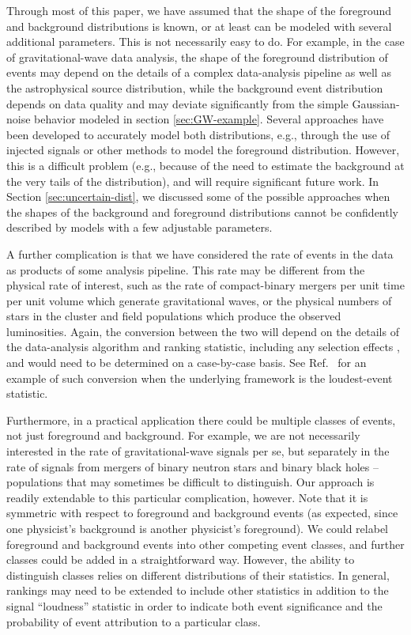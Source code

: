 \documentclass[aps,prd,reprint,nofootinbib]{revtex4-1}
\begin{document}
Through most of this paper, we have assumed that the shape of the
foreground and background distributions is known, or at least can be
modeled with several additional parameters.  This is not necessarily
easy to do.  For example, in the case of gravitational-wave data
analysis, the shape of the foreground distribution of events may
depend on the details of a complex data-analysis pipeline as well as
the astrophysical source distribution, while the background event
distribution depends on data quality and may deviate significantly
from the simple Gaussian-noise behavior modeled in section
\ref{sec:GW-example}.  Several approaches have been developed to
accurately model both distributions, e.g., through the use of injected
signals \cite{ihope} or other methods \cite{CannonHannaKeppel:2012} to
model the foreground distribution.  However, this is a difficult
problem (e.g., because of the need to estimate the background at the
very tails of the distribution), and will require significant future
work.  In Section \ref{sec:uncertain-dist}, we discussed some of the
possible approaches when the shapes of the background and foreground
distributions cannot be confidently described by models with a few
adjustable parameters.

A further complication is that we have considered the rate of events
in the data as products of some analysis pipeline.  This rate may be
different from the physical rate of interest, such as the rate of
compact-binary mergers per unit time per unit volume which generate
gravitational waves, or the physical numbers of stars in the cluster
and field populations which produce the observed luminosities.  Again,
the conversion between the two will depend on the details of the
data-analysis algorithm and ranking statistic, including any selection
effects \cite{Messenger2012}, and would need to be determined on a
case-by-case basis.  See Ref.~\cite{Brady2008} for an example of such
conversion when the underlying framework is the loudest-event
statistic.

Furthermore, in a practical application there could be multiple
classes of events, not just foreground and background.  For example,
we are not necessarily interested in the rate of gravitational-wave
signals per se, but separately in the rate of signals from mergers of
binary neutron stars and binary black holes -- populations that may
sometimes be difficult to distinguish.  Our approach is readily
extendable to this particular complication, however.  Note that it is
symmetric with respect to foreground and background events (as
expected, since one physicist's background is another physicist's
foreground).  We could relabel foreground and background events into
other competing event classes, and further classes could be added in a
straightforward way.  However, the ability to distinguish classes
relies on different distributions of their statistics.  In general,
rankings may need to be extended to include other statistics in
addition to the signal ``loudness'' statistic in order to indicate
both event significance and the probability of event attribution to a
particular class.
\end{document}

